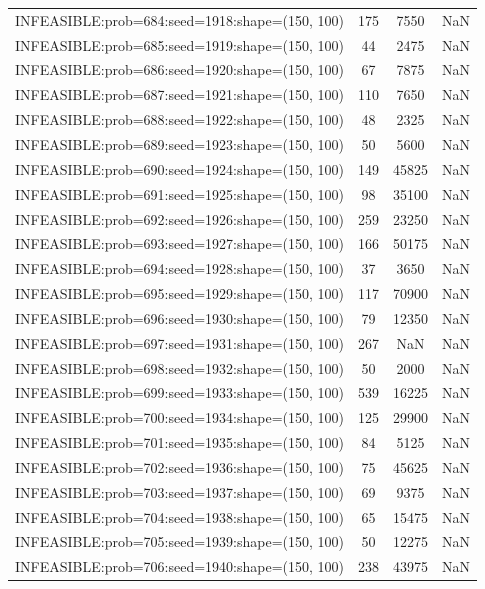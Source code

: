 \begin{longtable}{lccc}
INFEASIBLE:prob=684:seed=1918:shape=(150, 100) &   175 &  7550 &    NaN \\
INFEASIBLE:prob=685:seed=1919:shape=(150, 100) &    44 &  2475 &    NaN \\
INFEASIBLE:prob=686:seed=1920:shape=(150, 100) &    67 &  7875 &    NaN \\
INFEASIBLE:prob=687:seed=1921:shape=(150, 100) &   110 &  7650 &    NaN \\
INFEASIBLE:prob=688:seed=1922:shape=(150, 100) &    48 &  2325 &    NaN \\
INFEASIBLE:prob=689:seed=1923:shape=(150, 100) &    50 &  5600 &    NaN \\
INFEASIBLE:prob=690:seed=1924:shape=(150, 100) &   149 & 45825 &    NaN \\
INFEASIBLE:prob=691:seed=1925:shape=(150, 100) &    98 & 35100 &    NaN \\
INFEASIBLE:prob=692:seed=1926:shape=(150, 100) &   259 & 23250 &    NaN \\
INFEASIBLE:prob=693:seed=1927:shape=(150, 100) &   166 & 50175 &    NaN \\
INFEASIBLE:prob=694:seed=1928:shape=(150, 100) &    37 &  3650 &    NaN \\
INFEASIBLE:prob=695:seed=1929:shape=(150, 100) &   117 & 70900 &    NaN \\
INFEASIBLE:prob=696:seed=1930:shape=(150, 100) &    79 & 12350 &    NaN \\
INFEASIBLE:prob=697:seed=1931:shape=(150, 100) &   267 &   NaN &    NaN \\
INFEASIBLE:prob=698:seed=1932:shape=(150, 100) &    50 &  2000 &    NaN \\
INFEASIBLE:prob=699:seed=1933:shape=(150, 100) &   539 & 16225 &    NaN \\
INFEASIBLE:prob=700:seed=1934:shape=(150, 100) &   125 & 29900 &    NaN \\
INFEASIBLE:prob=701:seed=1935:shape=(150, 100) &    84 &  5125 &    NaN \\
INFEASIBLE:prob=702:seed=1936:shape=(150, 100) &    75 & 45625 &    NaN \\
INFEASIBLE:prob=703:seed=1937:shape=(150, 100) &    69 &  9375 &    NaN \\
INFEASIBLE:prob=704:seed=1938:shape=(150, 100) &    65 & 15475 &    NaN \\
INFEASIBLE:prob=705:seed=1939:shape=(150, 100) &    50 & 12275 &    NaN \\
INFEASIBLE:prob=706:seed=1940:shape=(150, 100) &   238 & 43975 &    NaN \\

\end{longtable}
